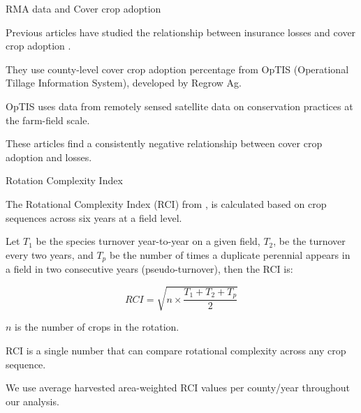 \documentclass[notes, 11pt, aspectratio=169]{beamer}
\newenvironment{wideitemize}{\itemize\addtolength{\itemsep}{10pt}}{\enditemize}
\begin{document}
\begin{frame}{RMA data and Cover crop adoption}
    \begin{wideitemize}
        \item Previous articles have studied the relationship between insurance losses and cover crop adoption \citep{aglasan2024, won2024}.
        \item They use county-level cover crop adoption percentage from OpTIS (Operational Tillage Information System), developed by Regrow Ag.
        \item OpTIS uses data from remotely sensed satellite data on conservation practices at the farm-field scale.
        \item These articles find a consistently negative relationship between cover crop adoption and losses.
    \end{wideitemize}
\end{frame} 


\begin{frame}{Rotation Complexity Index}
    \begin{wideitemize}
        \item The Rotational Complexity Index (RCI) from \cite{socolar2021}, is calculated based on crop sequences across six years at a field level.
        \item Let $T_{1}$ be the species turnover year-to-year on a given field, $T_{2}$, be the turnover every two years, and $T_{p}$ be the number of times a duplicate perennial appears in a field in two consecutive years (pseudo-turnover), then the RCI is:

        \begin{equation*}
            RCI = \sqrt{n\times\dfrac{T_{1}+T_{2}+T_{p}}{2}}
        \end{equation*}
        \item $n$ is the number of crops in the rotation. 
        \item RCI is a single number that can compare rotational complexity across any crop sequence.
        \item We use average harvested area-weighted RCI values per county/year throughout our analysis.
    \end{wideitemize}
\end{frame}
\end{document}

